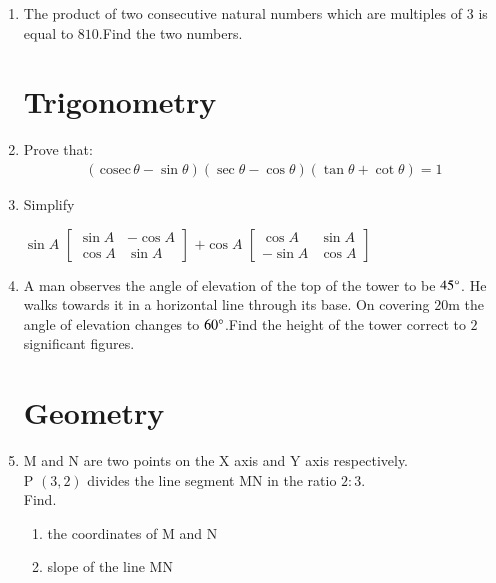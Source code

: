 \documentclass[12pt,-letter paper]{article}
\newcommand{\cosec}{\,\text{cosec}\,}
\providecommand{\brak}[1]{\ensuremath{\left(#1\right)}}
\begin{document}
\begin{enumerate}
\item The product of two consecutive natural numbers which are multiples of $3$ is equal to $810$.Find the two numbers.

\begin{center}
    \section*{Trigonometry}
\end{center}

\item Prove that:\\
\begin{align}
	\brak{\cosec\theta-\sin\theta}\brak{\sec\theta-\cos\theta}\brak{\tan\theta+\cot\theta}=1
\end{align}
\item Simplify \\
	\begin{center}
	        $\sin{A}$
		$\begin{bmatrix}
			\sin{A} & -\cos{A} \\
			\cos{A} &  \sin{A}
		 \end{bmatrix}$	
                  $+\cos{A}$
		  $\begin{bmatrix}
			\cos{A} & \sin{A} \\
		       -\sin{A} & \cos{A}
		  \end{bmatrix}$	  
	\end{center} 
\item A man observes the angle of elevation of the top of the tower to be $45\degree$. He walks towards it in a horizontal line through its base. On covering $20\mathrm{m}$ the angle of elevation changes to $60\degree$.Find the height of the tower correct to $2$ significant figures.


\begin{center}
    \section*{Geometry}
\end{center}
\item M and N are two points on the X axis and Y axis respectively.\\
      P \brak{3,2} divides the line segment MN in the ratio $2:3$.\\
      Find.
		\begin{enumerate}
		\item the coordinates of M and N
		\item slope of the line MN
		\end{enumerate}


\end{enumerate}
\end{document}
